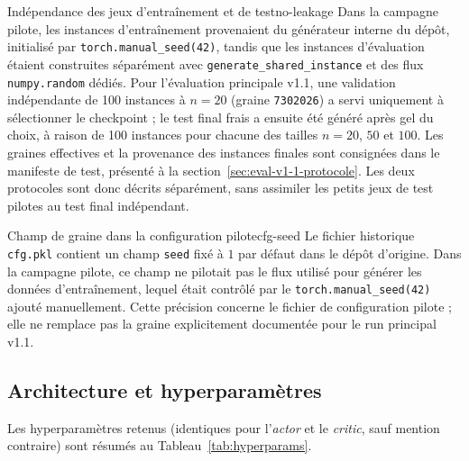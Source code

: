\documentclass[12pt, a4paper, twoside, openright]{book}
\begin{document}
\begin{remark}{Indépendance des jeux d'entraînement et de test}{no-leakage}
Dans la campagne pilote, les instances d'entraînement provenaient du générateur
interne du dépôt, initialisé par \texttt{torch.manual\_seed(42)}, tandis que les
instances d'évaluation étaient construites séparément avec
\texttt{generate\_shared\_instance} et des flux \texttt{numpy.random} dédiés.
Pour l'évaluation principale v1.1, une validation indépendante de 100 instances
à $n=20$ (graine \texttt{7302026}) a servi uniquement à sélectionner le
checkpoint ; le test final frais a ensuite été généré après gel du choix, à
raison de 100 instances pour chacune des tailles $n=20$, $50$ et $100$.
Les graines effectives et la provenance des instances finales sont consignées
dans le manifeste de test, présenté à la section~\ref{sec:eval-v1-1-protocole}.
Les deux protocoles sont donc décrits séparément, sans assimiler les petits jeux
de test pilotes au test final indépendant.
\end{remark}

\begin{remark}{Champ de graine dans la configuration pilote}{cfg-seed}
Le fichier historique \texttt{cfg.pkl} contient un champ \texttt{seed} fixé à
$1$ par défaut dans le dépôt d'origine. Dans la campagne pilote, ce champ ne
pilotait pas le flux utilisé pour générer les données d'entraînement, lequel
était contrôlé par le \texttt{torch.manual\_seed(42)} ajouté manuellement.
Cette précision concerne le fichier de configuration pilote ; elle ne remplace
pas la graine explicitement documentée pour le run principal v1.1.
\end{remark}

\subsection{Architecture et hyperparamètres}

Les hyperparamètres retenus (identiques pour l'\textit{actor} et le
\textit{critic}, sauf mention contraire) sont résumés au
Tableau~\ref{tab:hyperparams}.
\end{document}
